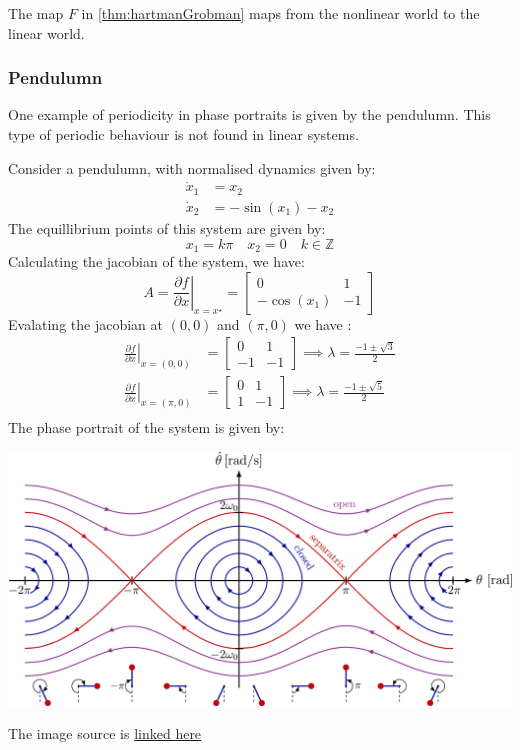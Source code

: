 The map \(F\) in \autoref{thm:hartmanGrobman} maps from the nonlinear world to the linear world. 
\subsubsection{Pendulumn}
One example of periodicity in phase portraits is given by the pendulumn. 
This type of periodic behaviour is not found in linear systems.
\begin{example}[Pendulumn]
    Consider a pendulumn, with normalised dynamics given by:
    \[
        \begin{aligned}
            \dot{x}_1 &= x_2  \\
            \dot{x}_2 &= -\sin(x_1) - x_2
        \end{aligned}
    \]
    The equillibrium points of this system are given by:
    \[
        x_1 = k\pi \quad x_2 = 0 \quad k\in\mathbb{Z}
    \]
    Calculating the jacobian of the system, we have:
    \[
        A = \left . \frac{\partial f}{\partial x} \right |_{x=x^{\star}} = \begin{bmatrix}
            0 & 1 \\
            -\cos(x_1) & -1
        \end{bmatrix}
    \]
    Evalating the jacobian at \((0,0)\) and \((\pi,0)\) we have :
    \[
        \begin{aligned}
            \left. \frac{\partial f}{\partial x} \right |_{x=(0,0)} &= \begin{bmatrix}
                0 & 1 \\
                -1 & -1
            \end{bmatrix} \implies \lambda = \frac{-1 \pm \sqrt{3}}{2} \\
            \left. \frac{\partial f}{\partial x} \right |_{x=(\pi,0)} &= \begin{bmatrix}
                0 & 1 \\
                1 & -1
            \end{bmatrix} \implies \lambda = \frac{-1 \pm \sqrt{5}}{2} \\
        \end{aligned}
    \]
    The phase portrait of the system is given by:
    \begin{center}
        \includegraphics[width=\linewidth]{figures/phaseportraits/pend.png}
    \end{center}
    The image source is \href{https://tikz.net/dynamics_phaseportrait/}{linked here}
\end{example}




